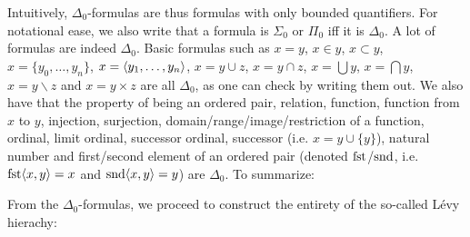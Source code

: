 Intuitively, $\Delta_0$-formulas are thus formulas with only bounded quantifiers. For notational ease, we also write that a formula is $\Sigma_0$ or $\Pi_0$ iff it is $\Delta_0$. A lot of formulas are indeed $\Delta_0$. Basic formulas such as $x=y$, $x\in y$, $x\subset y$, $x=\{y_0,\hdots,y_n\}$, $x=\langle y_1,\hdots,y_n\rangle$, $x=y\cup z$, $x=y\cap z$, $x=\bigcup y$, $x=\bigcap y$, $x=y\backslash z$ and $x=y\times z$ are all $\Delta_0$, as one can check by writing them out. We also have that the property of being an ordered pair, relation, function, function from $x$ to $y$, injection, surjection, domain/range/image/restriction of a function, ordinal, limit ordinal, successor ordinal, successor (i.e. $x=y\cup\{y\}$), natural number and first/second element of an ordered pair (denoted $\operatorname{fst}$/$\operatorname{snd}$, i.e. $\operatorname{fst}\langle x,y\rangle=x$ and $\operatorname{snd}\langle x,y\rangle=y$) are $\Delta_0$. To summarize:


From the $\Delta_0$-formulas, we proceed to construct the entirety of the so-called Lévy hierachy:


